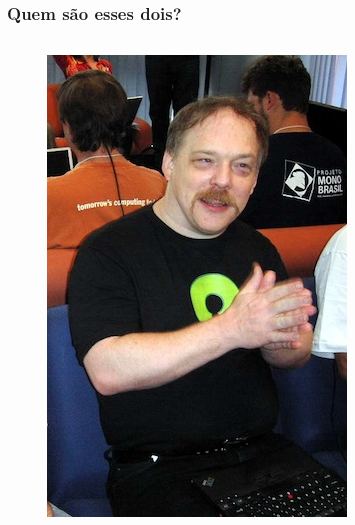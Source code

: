 \documentclass[xcolor=dvipsnames]{beamer}
\begin{document}
 \begin{frame}
 	\frametitle{Quem são esses dois?}
 
 	\begin{columns}
 \begin{column}[l]{4.5cm}
 	\begin{figure}
 	\includegraphics[scale=0.3]{esr.jpg}\\
 	\end{figure}
 \end{column}
 \begin{column}[c]{4.5cm}
 	\begin{figure}

\end{figure}
\end{column}
\end{columns}
\end{frame}
\end{document}
